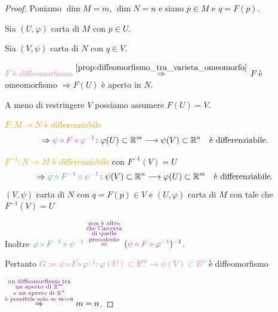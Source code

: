         \begin{proof}
        \mbox{}

        Poniamo $\dim M = m$, $\dim N = n$ e siano $p \in M$ e $q = F(p)$.

        Sia $(U, \varphi)$ carta di $M$ con $p \in U$.

        Sia $(V, \psi)$ carta di $N$ con $q \in V$.

        \textcolor{violet}{$F$ è diffeomorfismo $\overset{\ref{prop:diffeomorfismo_tra_varieta_omeomorfo}}{\Rightarrow}$} $F$ è omeomorfismo $\Rightarrow F(U)$ è aperto in $N$.

        A meno di restringere $V$ possiamo assumere $F(U) = V$.

        \textcolor{orange}{$F \colon M \to N$ è differenziabile}
        \[
        \Rightarrow \textcolor{hotpink}{\psi \circ F \circ \varphi^{-1}} \colon \varphi(U) \subset \mathbb{R}^m \longrightarrow \psi(V) \subset \mathbb{R}^n \quad \text{è differenziabile.}
        \]

        \textcolor{orange}{$F^{-1} \colon N \to M$ è differenziabile} con $F^{-1}(V) = U$
        \[
        \Rightarrow \textcolor{celeste}{\varphi \circ F^{-1} \circ \psi^{-1}} \colon \psi(V) \subset \mathbb{R}^n \longrightarrow \varphi(U) \subset \mathbb{R}^m \quad \text{è differenziabile.}
        \]
        \textcolor{blu}{$(V, \psi)$ carta di $N$ con $q=F(p) \in V$ e $(U, \varphi)$ carta di $M$ con tale che $F^{-1}(V) = U$}

        Inoltre $\textcolor{celeste}{\varphi \circ F^{-1} \circ \psi^{-1}} \overset{\textcolor{violet}{\substack{\text{non è altro} \\ \text{che l'inversa} \\ \text{di quella} \\ \text{precedente}}}}{=} (\textcolor{hotpink}{\psi \circ F \circ \varphi^{-1}})^{-1}$.

        Pertanto \textcolor{hotpink}{$G := \psi \circ F \circ \varphi^{-1} \colon \varphi(U) \subset \mathbb{R}^m \longrightarrow \psi(V) \subset \mathbb{R}^n$} è diffeomorfismo 

        $\overset{\textcolor{violet}{\substack{\text{un diffeomorfismo tra} \\ \text{un aperto di } \mathbb{R}^m  \\ \text{e un aperto di } \mathbb{R}^n \\ \text{è possibile solo se } m=n}}}{\Rightarrow} m = n$.
        \end{proof}
        \newpage
